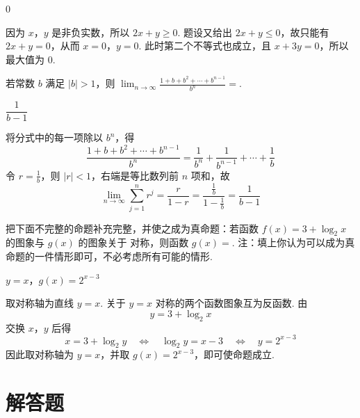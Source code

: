 \begin{answer}
0
\end{answer}

\begin{solution}
因为 \(x\)，\(y\) 是非负实数，所以 \(2x+y\geqslant0\). 题设又给出 \(2x+y\leqslant0\)，故只能有 \(2x+y=0\)，从而 \(x=0\)，\(y=0\). 此时第二个不等式也成立，且 \(x+3y=0\)，所以最大值为 \(0\).
\end{solution}



\begin{problem}
若常数 \(b\) 满足 \(|b| > 1\)，则 \(\displaystyle\lim_{n \to \infty} \frac{1 + b + b^2 + \cdots + b^{n-1}}{b^n} = \)\fillinblank{}.
\end{problem}


\begin{answer}
\(\dfrac{1}{b-1}\)
\end{answer}

\begin{solution}
将分式中的每一项除以 \(b^n\)，得
\[
\frac{1+b+b^2+\cdots+b^{n-1}}{b^n}=\frac{1}{b^n}+\frac{1}{b^{n-1}}+\cdots+\frac{1}{b}
\]
令 \(r=\frac{1}{b}\)，则 \(|r|<1\)，右端是等比数列前 \(n\) 项和，故
\[
\lim_{n\to\infty}\sum_{j=1}^{n}r^j=\frac{r}{1-r}=\frac{\frac{1}{b}}{1-\frac{1}{b}}=\frac{1}{b-1}
\]
\end{solution}



\begin{problem}
把下面不完整的命题补充完整，并使之成为真命题：若函数 \(f(x)=3+\log_{2}x\) 的图象与 \(g(x)\) 的图象关于\fillinblank{} 对称，则函数 \(g(x)=\)\fillinblank{}. 注：填上你认为可以成为真命题的一件情形即可，不必考虑所有可能的情形.
\end{problem}


\begin{answer}
\(y=x\)，\(g(x)=2^{x-3}\)
\end{answer}

\begin{solution}
取对称轴为直线 \(y=x\). 关于 \(y=x\) 对称的两个函数图象互为反函数. 由
\[
y=3+\log_2x
\]
交换 \(x\)，\(y\) 后得
\[
x=3+\log_2y
\quad\Longleftrightarrow\quad
\log_2y=x-3
\quad\Longleftrightarrow\quad
y=2^{x-3}
\]
因此取对称轴为 \(y=x\)，并取 \(g(x)=2^{x-3}\)，即可使命题成立.
\end{solution}



\section{解答题}


